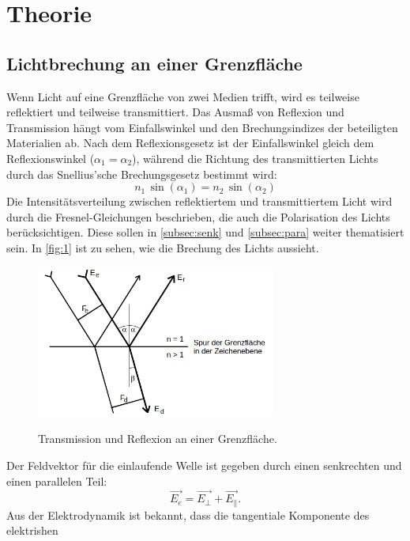 \section{Theorie}
\label{sec:Theorie}

\subsection{Lichtbrechung an einer Grenzfläche}
Wenn Licht auf eine Grenzfläche von zwei Medien trifft, wird es teilweise
reflektiert und teilweise transmittiert. Das Ausmaß von Reflexion und
Transmission hängt vom Einfallswinkel und den Brechungsindizes der beteiligten
Materialien ab. Nach dem Reflexionsgesetz ist der Einfallswinkel gleich dem
Reflexionswinkel ($\alpha_1 = \alpha_2$), während die Richtung des transmittierten
Lichts durch das Snellius'sche Brechungsgesetz bestimmt wird: 
\begin{equation}
    \label{eqn:1}
    n_1 \, \sin(\alpha_1) = n_2 \, \sin(\alpha_2)
\end{equation}
\noindent Die Intensitätsverteilung zwischen 
reflektiertem und transmittiertem Licht wird durch die Fresnel-Gleichungen
beschrieben, die auch die Polarisation des Lichts berücksichtigen. Diese 
sollen in \autoref{subsec:senk} und \autoref{subsec:para} weiter thematisiert 
sein. In \autoref{fig:1} ist zu sehen, wie die Brechung des Lichts aussieht.
\begin{figure}[H]
    \caption{Transmission und Reflexion an einer Grenzfläche.\cite{anleitung8}}
    \centering
    \includegraphics[width=0.7\textwidth]{"Bilder/brechung.png"}
    \label{fig:1}
\end{figure}
\noindent Der Feldvektor für die einlaufende Welle ist gegeben durch einen 
senkrechten und einen parallelen Teil:
\begin{equation}
    \label{eqn:2}
    \vec{E_e} = \vec{E_{\perp}} + \vec{E_{\parallel}}.
\end{equation}
Aus der Elektrodynamik ist bekannt, dass die tangentiale Komponente des elektrishen 

